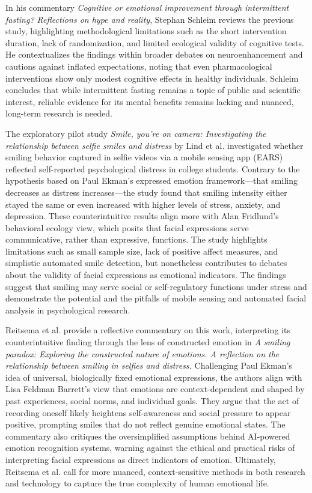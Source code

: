 \documentclass[authordate, empirical, issue]{jote-new-article}
\begin{document}
	In his commentary \emph{Cognitive or emotional improvement through intermittent fasting? Reflections on hype and reality}, Stephan Schleim reviews the previous study, highlighting methodological limitations such as the short intervention duration, lack of randomization, and limited ecological validity of cognitive tests. He contextualizes the findings within broader debates on neuroenhancement and cautions against inflated expectations, noting that even pharmacological interventions show only modest cognitive effects in healthy individuals. Schleim concludes that while intermittent fasting remains a topic of public and scientific interest, reliable evidence for its mental benefits remains lacking and nuanced, long-term research is needed.



	The exploratory pilot study \emph{Smile, you're on camera: Investigating the relationship between selfie smiles and distress} by Lind et al. investigated whether smiling behavior captured in selfie videos via a mobile sensing app (EARS) reflected self-reported psychological distress in college students. Contrary to the hypothesis based on Paul Ekman's expressed emotion framework—that smiling decreases as distress increases—the study found that smiling intensity either stayed the same or even increased with higher levels of stress, anxiety, and depression. These counterintuitive results align more with Alan Fridlund's behavioral ecology view, which posits that facial expressions serve communicative, rather than expressive, functions. The study highlights limitations such as small sample size, lack of positive affect measures, and simplistic automated smile detection, but nonetheless contributes to debates about the validity of facial expressions as emotional indicators. The findings suggest that smiling may serve social or self-regulatory functions under stress and demonstrate the potential and the pitfalls of mobile sensing and automated facial analysis in psychological research.



	Reitsema et al. provide a reflective commentary on this work, interpreting its counterintuitive finding through the lens of constructed emotion in \emph{A smiling paradox: Exploring the constructed nature of emotions. A reflection on the relationship between smiling in selfies and distress.} Challenging Paul Ekman's idea of universal, biologically fixed emotional expressions, the authors align with Lisa Feldman Barrett's view that emotions are context-dependent and shaped by past experiences, social norms, and individual goals. They argue that the act of recording oneself likely heightens self-awareness and social pressure to appear positive, prompting smiles that do not reflect genuine emotional states. The commentary also critiques the oversimplified assumptions behind AI-powered emotion recognition systems, warning against the ethical and practical risks of interpreting facial expressions as direct indicators of emotion. Ultimately, Reitsema et al. call for more nuanced, context-sensitive methods in both research and technology to capture the true complexity of human emotional life.
\end{document}
